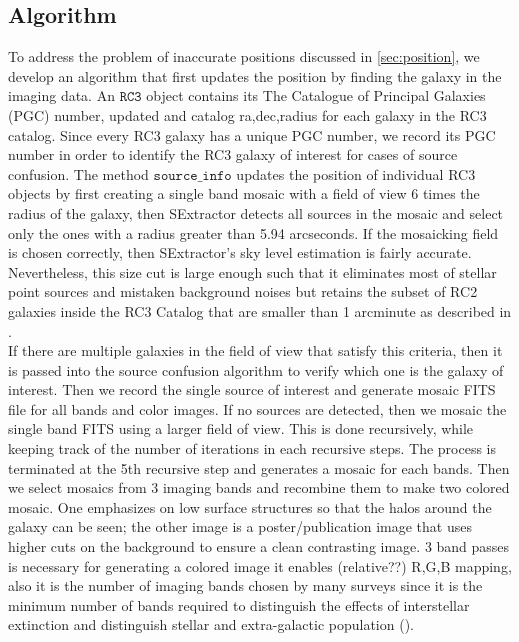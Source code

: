 \documentclass[5p]{elsarticle}
\begin{document}
	\subsection{Algorithm} 
	To address the problem of inaccurate positions discussed in \autoref{sec:position}, we develop an algorithm that first updates the position by finding the galaxy in the imaging data. An  $\texttt{RC3}$ object contains its The Catalogue of Principal Galaxies (PGC) number, updated and catalog ra,dec,radius for each galaxy in the RC3 catalog. Since every RC3 galaxy has a unique PGC number, we record  its PGC number in order to identify the RC3 galaxy of interest for cases of source confusion. The method $\texttt{source\_info}$ updates the position of individual RC3 objects by first creating a single band mosaic with a field of view 6 times the radius of the galaxy, then SExtractor detects all sources in the mosaic and select only the ones with a radius greater than 5.94 arcseconds.  If the mosaicking field is chosen correctly, then SExtractor's sky level estimation is fairly accurate.  Nevertheless, this size cut is large enough such that it eliminates most of stellar point sources and mistaken background noises  but retains the subset of RC2 galaxies inside the RC3 Catalog that are smaller than 1 arcminute as described in \citet{rc2}. 
\\
\indent If there are multiple galaxies in the field of view that satisfy this criteria, then it is passed into the source confusion algorithm to verify which one is the galaxy of interest. Then we record the single source of interest and generate mosaic FITS file for all bands and color images. If no sources are detected, then we mosaic  the single band FITS using a larger field of view. This is done recursively, while keeping track of the number of iterations in each recursive steps. The process is terminated at the 5th recursive step and generates a mosaic for each bands. Then we select mosaics from 3 imaging bands  and recombine them to make two  colored mosaic. One emphasizes on low surface structures  so that the halos around the galaxy can be seen; the other image is a poster/publication image that uses higher cuts on the background to ensure a clean contrasting image. 3 band passes is necessary for generating a colored image it enables (relative??) R,G,B mapping, also it is the number of imaging bands chosen by many surveys since it is the minimum number of bands required to distinguish the effects of interstellar extinction and distinguish stellar and extra-galactic population (\citet{2mass}).
\end{document}
